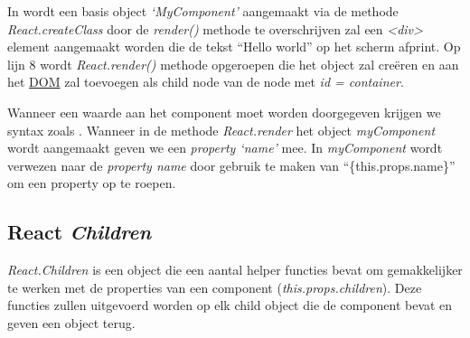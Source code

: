		
		In  wordt een basis object \emph{`MyComponent'} aangemaakt via de methode \emph{React.createClass} door de \emph{render()} methode te overschrijven zal een \emph{<div>} element aangemaakt worden die de tekst ``Hello world'' op het scherm afprint. Op lijn 8 wordt \emph{React.render()} methode opgeroepen die het object zal creëren en aan het \hyperref[dom]{DOM} zal toevoegen als child node van de node met \emph{id = container}.
		
		Wanneer een waarde aan het component moet worden doorgegeven krijgen we syntax zoals . Wanneer in de methode \emph{React.render} het object \emph{myComponent} wordt aangemaakt geven we een \emph{property `name'} mee. In \emph{myComponent} wordt verwezen naar de \emph{property name} door gebruik te maken van ``\{this.props.name\}'' om een property op te roepen.
		
		

	
	\subsection{React \emph{Children}}
		
		\emph{React.Children} is een object die een aantal helper functies bevat om gemakkelijker te werken met de properties van een component (\emph{this.props.children}). Deze functies zullen uitgevoerd worden op elk child object die de component bevat en geven een object terug.
		
